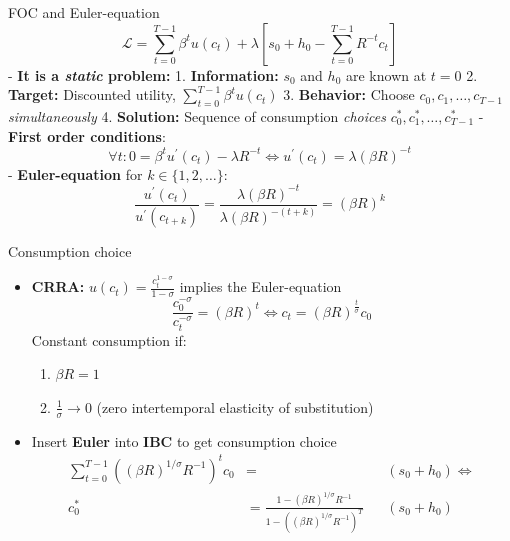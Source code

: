 \documentclass[
  10pt,
  ignorenonframetext,
  aspectratio=43,
  english,
  handout]{beamer}
\providecommand{\tightlist}{%
  \setlength{\itemsep}{0pt}\setlength{\parskip}{0pt}}
\begin{document}
\begin{frame}{FOC and Euler-equation}
\protect{}\label{foc-and-euler-equation}
\[
\mathcal{L}=\sum^{T-1}_{t=0}\beta^{t}u(c_{t})+\lambda\left[s_{0}+h_{0}-\sum^{T-1}_{t=0}R^{-t}c_{t}\right]
\] - \textbf{It is a \emph{static} problem:} 1. \textbf{Information:}
\(s_{0}\) and \(h_{0}\) are known at \(t=0\) 2. \textbf{Target:}
Discounted utility, \(\sum^{T-1}_{t=0}\beta^{t}u(c_{t})\) 3.
\textbf{Behavior:} Choose \(c_{0},c_{1},\dots,c_{T-1}\)
\emph{simultaneously} 4. \textbf{Solution:} Sequence of consumption
\emph{choices} \(c^{\ast}_{0},c^{\ast}_{1},\dots,c^{\ast}_{T-1}\) -
\textbf{First order conditions}: \[
    \forall t:0=\beta^{t}u^{\prime}(c_{t})-\lambda R^{-t}\Leftrightarrow u^{\prime}(c_{t})=\lambda\left(\beta R\right)^{-t}
    \] - \textbf{Euler-equation} for \(k\in\{1,2,\dots\}\): \[
    \frac{u^{\prime}(c_{t})}{u^{\prime}(c_{t+k})}=\frac{\lambda\left(\beta R\right)^{-t}}{\lambda\left(\beta R\right)^{-(t+k)}}=\left(\beta R\right)^{k}
    \]
\end{frame}

\begin{frame}{Consumption choice}
\protect{}\label{consumption-choice}
\begin{itemize}
\tightlist
\item
  \textbf{CRRA:} \(u(c_{t})=\frac{c^{1-\sigma}_{t}}{1-\sigma}\) implies
  the Euler-equation \[
    \frac{c^{-\sigma}_{0}}{c^{-\sigma}_{t}}=\left(\beta R\right)^{t}\Leftrightarrow c_{t}=(\beta R)^{\frac{t}{\sigma}}c_{0}
    \] Constant consumption if:

  \begin{enumerate}
  \tightlist
  \item
    \(\beta R=1\)
  \item
    \(\frac{1}{\sigma}\rightarrow0\) (zero intertemporal elasticity of
    substitution)
  \end{enumerate}
\item
  Insert \textbf{Euler} into \textbf{IBC} to get consumption choice \[
    \begin{aligned}
    \sum^{T-1}_{t=0}\left((\beta R)^{1/\sigma}R^{-1}\right)^{t}c_{0} & = && (s_{0}+h_{0})\Leftrightarrow\\
    c^{\ast}_{0} & =  \frac{1-(\beta R)^{1/\sigma}R^{-1}}{1-\left((\beta R)^{1/\sigma}R^{-1}\right)^{T}}&&(s_{0}+h_{0})
    \end{aligned}
    \]
\end{itemize}
\end{frame}
\end{document}
